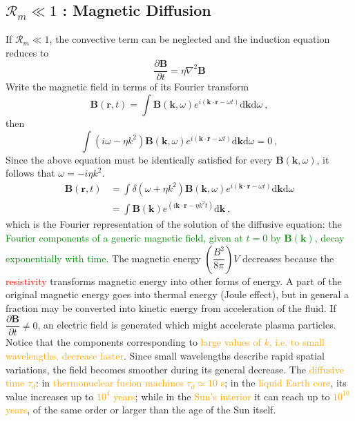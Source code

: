 \documentclass[12pt,a4paper]{article}
\renewcommand{\vec}[1]{\boldsymbol{#1}}
\newcommand{\dif}{\mathrm{d}}
\begin{document}
\subsection{$\mathcal{R}_m \ll 1$ : Magnetic Diffusion}
If $\mathcal{R}_m \ll 1$, the convective term can be neglected and the induction equation reduces to
\begin{equation*}
\frac{\partial \vec{B} }{\partial t} = \eta \nabla^2 \vec{B} 
\end{equation*}
Write the magnetic field in terms of its Fourier transform
\begin{equation*}
\vec{B}(\vec{r}, t) = \int  \vec{B}(\vec{k}, \omega) e^{i(\vec{k}\cdot \vec{r} -\omega t)} \dif \vec{k} \dif \omega ~,
\end{equation*}
then
\begin{equation*}
\int (i\omega -\eta k^2) \vec{B}(\vec{k}, \omega) e^{i(\vec{k}\cdot \vec{r} -\omega t)} \dif \vec{k} \dif \omega = 0 ~,
\end{equation*}
Since the above equation must be identically satisfied for every $\vec{B}(\vec{k}, \omega)$, it follows that $\omega = -i\eta k^2$. 
\begin{align*}
\vec{B}(\vec{r}, t) &= \int \delta(\omega +\eta k^2) \vec{B}(\vec{k}, \omega) e^{i(\vec{k}\cdot \vec{r} -\omega t)} \dif \vec{k} \dif \omega \\
&= \int \vec{B}(\vec{k}) e^{(i\vec{k}\cdot \vec{r} -\eta k^2 t)} \dif \vec{k} ~,
\end{align*}
which is the Fourier representation of the solution of the diffusive equation: the \textcolor{green}{Fourier components of a generic magnetic field, given at $t = 0$ by $\vec{B}(\vec{k})$, decay exponentially with time}. The magnetic energy $\left(\dfrac{B^2}{8\pi} \right)V$ decreases because the \textcolor{red}{resistivity} transforms magnetic energy into other forms of energy. A part of the original magnetic energy goes into thermal energy (Joule effect), but in general a fraction may be converted into kinetic energy from acceleration of the fluid. If $\dfrac{\partial \vec{B} }{\partial t} \neq 0$, an electric field is generated which might accelerate plasma particles. Notice that the components corresponding to \textcolor{orange}{large values of $k$, i.e. to small wavelengths, decrease faster}. Since small wavelengths describe rapid spatial variations, the field becomes smoother during its general decrease. The \textcolor{orange}{diffusive time $\tau_d$}: in \textcolor{orange}{thermonuclear fusion machines $\tau_d \simeq 10$ s}; in the \textcolor{orange}{liquid Earth core}, its value increases up to \textcolor{orange}{$10^4$ years}; while in the \textcolor{orange}{Sun's interior} it can reach up to \textcolor{orange}{$10^{10}$ years}, of the same order or larger than the age of the Sun itself.
\end{document}
